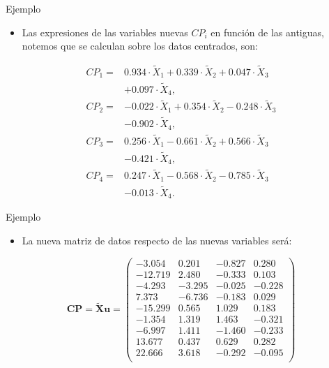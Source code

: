 \documentclass[
  ignorenonframetext,
]{beamer}
\providecommand{\tightlist}{%
  \setlength{\itemsep}{0pt}\setlength{\parskip}{0pt}}
\begin{document}
\begin{frame}{Ejemplo}
\protect\hypertarget{ejemplo-5}{}
\begin{itemize}
\tightlist
\item
  Las expresiones de las variables nuevas \(CP_i\) en función de las
  antiguas, notemos que se calculan sobre los datos centrados, son:
\end{itemize}

\[
\begin{array}{rl}
CP_1 = & 0.934\cdot \tilde{X}_1 + 0.339\cdot \tilde{X}_2 + 0.047\cdot
\tilde{X}_3\\ & + 0.097 \cdot \tilde{X}_4, \\
CP_2 = & -0.022\cdot \tilde{X}_1 +0.354\cdot \tilde{X}_2 -0.248 \cdot
\tilde{X}_3 \\ & -0.902 \cdot \tilde{X}_4, \\
CP_3 = & 0.256\cdot \tilde{X}_1 -0.661 \cdot \tilde{X}_2 +0.566\cdot \tilde{X}_3
\\ &-0.421\cdot \tilde{X}_4, \\
CP_4 = & 0.247 \cdot \tilde{X}_1 - 0.568\cdot \tilde{X}_2 - 0.785\cdot
\tilde{X}_3 \\ & - 0.013 \cdot \tilde{X}_4.
\end{array}
\]
\end{frame}

\begin{frame}{Ejemplo}
\protect\hypertarget{ejemplo-6}{}
\begin{itemize}
\tightlist
\item
  La nueva matriz de datos respecto de las nuevas variables será:
\end{itemize}

\[
\mathbf{CP}= \tilde{\mathbf{X}} \mathbf{u} =
\left(
\begin{array}{rrrr}
-3.054 & 0.201 & -0.827 & 0.280 \\
-12.719 & 2.480 & -0.333 & 0.103 \\
-4.293 & -3.295 & -0.025 & -0.228 \\
7.373 & -6.736 & -0.183 & 0.029 \\
-15.299 & 0.565 & 1.029 & 0.183 \\
-1.354 & 1.319 & 1.463 & -0.321 \\
-6.997 & 1.411 & -1.460 & -0.233 \\
13.677 & 0.437 & 0.629 & 0.282 \\
22.666 & 3.618 & -0.292 & -0.095 \\
\end{array}
\right)
\]
\end{frame}
\end{document}
